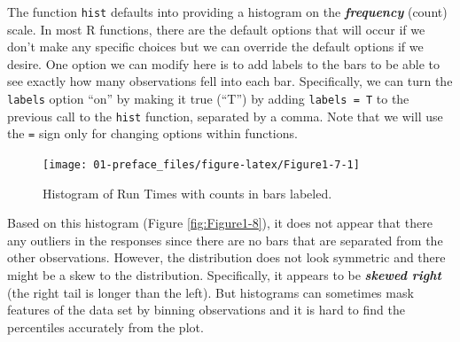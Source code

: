 \documentclass[
]{book}
\newenvironment{Shaded}{\begin{snugshade}}{\end{snugshade}}
\newcommand{\AttributeTok}[1]{\textcolor[rgb]{0.77,0.63,0.00}{#1}}
\newcommand{\FunctionTok}[1]{\textcolor[rgb]{0.00,0.00,0.00}{#1}}
\newcommand{\NormalTok}[1]{#1}
\newcommand{\SpecialCharTok}[1]{\textcolor[rgb]{0.00,0.00,0.00}{#1}}
\begin{document}
\indent The function \texttt{hist} defaults into providing a histogram on the \textbf{\emph{frequency}}
(count) scale. In most R functions, there are the default options that will
occur if we don't make any specific choices but we
can override the default options if we desire. One option we can modify here is
to add labels to the bars to be able to see exactly how many observations fell
into each bar. Specifically, we can turn the \texttt{labels} option ``on'' by making it true (``T'') by adding \texttt{labels\ =\ T} to the previous call to the \texttt{hist} function, separated by a comma. Note that we will use the \texttt{=} sign only for changing options within functions.

\begin{Shaded}
\end{Shaded}



\begin{figure}[ht!]

{\centering \texttt{[image: 01-preface\_files/figure-latex/Figure1-7-1]} 

}

\caption{Histogram of Run Times with counts in bars labeled.}\label{fig:Figure1-7}
\end{figure}

\indent Based on this histogram (Figure \ref{fig:Figure1-8}), it does not appear that there any outliers in the responses
since there are no bars that are separated from the other observations. However,
the distribution does not look symmetric and there might be a skew to the
distribution. Specifically, it appears to be \textbf{\emph{skewed right}} (the right tail is longer than the left). But histograms can sometimes mask features of
the data set by binning observations and it is hard to find the percentiles
accurately from the plot.
\end{document}
